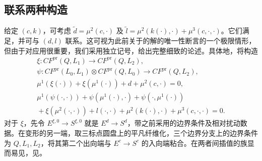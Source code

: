 \clearpage
\subsection{联系两种构造}\label{sec:17g}
给定 $(c,k)$，可考虑 $\tilde d=\mu^2(c,\cdot)$ 及 $\tilde l=\mu^2(k(\cdot),\cdot)+\mu^3(c,\cdot,\cdot)$。它们满足，并可与 $(d,l)$ 联系。这可视为此前关于的解的唯一性断言的一个极限情形，但由于对应用很重要，我们采用独立记号，给出完整细致的论述。具体地，将构造
\begin{equation}\label{eq:17.19}
\boxed{\begin{gathered}
\xi:CF^{\mathrm{pr}}(Q,L_1)\longrightarrow CF^{\mathrm{pr}}(Q,L_2),\\
\psi:CF^{\mathrm{pr}}(L_0,L_1)\otimes CF^{\mathrm{pr}}(Q,L_0)\longrightarrow CF^{\mathrm{pr}}(Q,L_2),\\
\mu^1(\xi(\cdot))+\xi(\mu^1(\cdot))+d+\mu^2(c,\cdot)=0,\\
\mu^1(\psi(\cdot,\cdot))+\psi(\mu^1(\cdot),\cdot)+\psi(\cdot,\mu^1(\cdot))\\
{}+\xi(\mu^2(\cdot,\cdot))+l(\cdot,\cdot)
+\mu^2(k(\cdot),\cdot)+\mu^3(c,\cdot,\cdot)=0.
\end{gathered}}
\end{equation}
对于 $\xi$，先令 $E^{\xi,0}\to S^{\xi,0}$ 就是 $E^d\to S^d$，带之前采用的边界条件及相对扰动数据。在变形的另一端，取三标点圆盘上的平凡纤维化，三个边界分支上的边界条件为 $Q,L_1,L_2$，将其第二个出向端与 $E^c\to S^c$ 的入向端粘合。在两者间插值的族显而易见，见。

